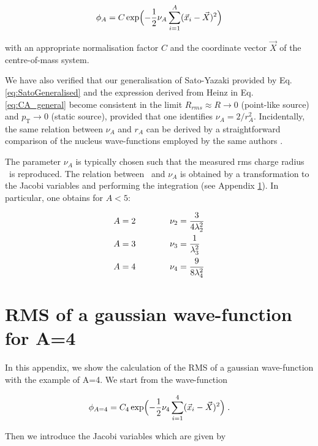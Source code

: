 \documentclass[a4paper,11pt]{scrartcl} %
\begin{document}
\begin{appendix}
\begin{equation}\label{eq:SatoWave}
 \phi_{A} = C \exp\Bigl(-{1\over2} \nu_{A} \sum_{i=1}^{A}(\vec{x}_{i} - \vec{X})^2 \Bigr)
\end{equation}

\noindent with an appropriate normalisation factor $C$ and the coordinate vector $\vec{X}$ of the centre-of-mass system. 
 
We have also verified that our generalisation of Sato-Yazaki provided by Eq. \ref{eq:SatoGeneralised} and the expression derived from Heinz in Eq. \ref{eq:CA_general} become consistent in the limit $R_{rms} \approx R \rightarrow 0$ (point-like source) and $p_{\mathrm{T}} \rightarrow 0$ (static source), provided that one identifies $\nu_{A} = {2 / r_{A}^{2}}$. Incidentally, the same relation between $\nu_{A}$ and $r_{A}$ can be derived by a straightforward comparison of the nucleus wave-functions employed by the same authors \cite{Scheibl:1998tk,Sato:1981ez}. 

The parameter $\nu_{A}$ is typically chosen such that the measured rms charge radius \rmsradius~is reproduced. The relation between \rmsradius~and $\nu_{A}$ is obtained by a transformation to the Jacobi variables and performing the integration (see Appendix \ref{appendix:integration}). In particular, one obtains for $A < 5$:

\begin{align}
	A& = 2 \qquad \qquad \nu_{2} = {3 \over {4\ensuremath{\lambda_{2}}^2}}  \\
	A& = 3 \qquad \qquad \nu_{3} = {1 \over {\ensuremath{\lambda_{3}}^2}} \\
	A& = 4 \qquad \qquad \nu_{4} =  {9 \over {8\ensuremath{\lambda_{4}}^2}}
\end{align}


%
%
\newpage
\section{RMS of a gaussian wave-function for A=4 }\label{appendix:integration}

In this appendix, we show the calculation of the RMS of a gaussian wave-function with the example of A=4. We start from the wave-function

\begin{equation}\label{eq:SatoWave}
 \phi_{A=4} = C_{4} \exp\Bigl(-{1\over2} \nu_{4} \sum_{i=1}^{4}(\vec{x}_{i} - \vec{X})^2 \Bigr) \; .
\end{equation}

\noindent Then we introduce the Jacobi variables which are given by %


\end{appendix}
\end{document}
